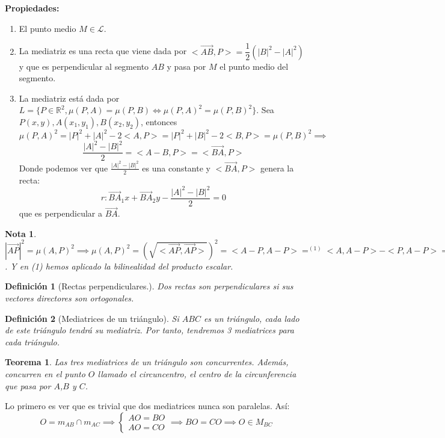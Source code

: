 \documentclass[11pt, a4paper, titlepage]{article}
\makeatletter
\renewenvironment{proof}[1][\proofname] {\vspace{-15pt}\par\pushQED{\qed}\normalfont\topsep6\p@\@plus6\p@\relax\trivlist\item[\hskip\labelsep\it#1\@addpunct{.}]\ignorespaces}{\popQED\endtrivlist\@endpefalse}
\renewcommand{\vec}{\overrightarrow}
\theoremstyle{theorem-style}
\newtheorem*{nth}{Teorema}
\theoremstyle{definition-style}
\newtheorem*{ndef}{Definición}
\theoremstyle{remark-style}
\newtheorem*{nota}{Nota}
\theoremstyle{example-style}
\newenvironment{nlist}
{\begin{enumerate}
\renewcommand\labelenumi{(\emph{\roman{enumi})}}}
{\end{enumerate}}
\makeatother
\begin{document}
\textbf{Propiedades:}
\begin{nlist}
	\item El punto medio $M \in \mathcal{L}$. 
	\item La mediatriz es una recta que viene dada por $<\vec{AB},P> = \dfrac{1}{2}(|B|^2-|A|^2)$ y que es perpendicular al segmento $AB$ y pasa por $M$ el punto medio del segmento.\\
		\begin{proof}
		La mediatriz está dada por $L = \{P\in\mathbb{R}^2, \mu(P,A) = \mu(P,B)\iff \mu(P,A)^2 = \mu(P,B)^2\}$. Sea $P(x,y),A(x_1,y_1),B(x_2,y_2)$, entonces $\mu(P,A)^2 = |P|^2+|A|^2-2<A,P> = |P|^2+|B|^2-2<B,P>= \mu(P,B)^2 \implies$ $$ \frac{|A|^2-|B|^2}{2} =<A-B,P> = <\vec{BA},P>$$
		Donde podemos ver que $\frac{|A|^2-|B|^2}{2}$ es una constante y $<\vec{BA},P>$ genera la recta:
		\[
		r: \vec{BA}_1x+ \vec{BA}_2y - \frac{|A|^2-|B|^2}{2} = 0
		\]
		que es perpendicular a $\vec{BA}$.
		\end{proof}
\end{nlist}
\begin{nota}
	$|\vec{AP}|^2 = \mu(A,P)^2\implies \mu(A,P)^2 = (\sqrt{<\vec{AP},\vec{AP}>})^2 =  < A-P, A-P>  =^{(1)} <A,A-P>-<P,A-P> = <A,A> -<A,P>+<P,P>-<P,A>  = |A|^2+|P|^2-2<P,A>$. Y en (1) hemos aplicado la bilinealidad del producto escalar.
\end{nota}

\begin{ndef}[Rectas perpendiculares.]
	Dos rectas son perpendiculares si sus vectores directores son ortogonales.
\end{ndef}

\begin{ndef}[Mediatrices de un triángulo]
	Si $ABC$ es un triángulo, cada lado de este triángulo tendrá su mediatriz. Por tanto, tendremos 3 mediatrices para cada triángulo.
\end{ndef}

\begin{nth}
	Las tres mediatrices de un triángulo son concurrentes. Además, concurren en el punto $O$ llamado el circuncentro, el centro de la circunferencia que pasa por $A$,$B$ y $C$.
\end{nth}
\begin{proof}
	Lo primero es ver que es trivial que dos mediatrices nunca son paralelas. Así:
	\[
	O = m_{AB} \cap m_{AC}\implies \begin{cases}
	AO = BO\\
	AO = CO
\end{cases} \implies BO = CO \implies O \in M_{BC}
	\]
\end{proof}
\end{document}
